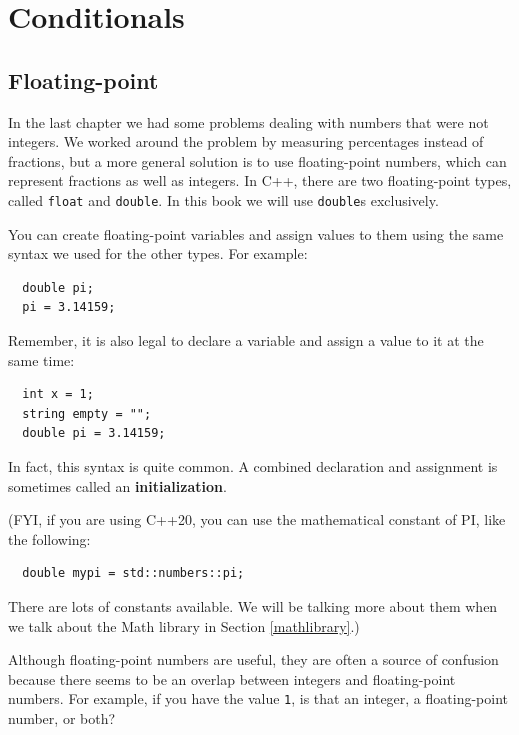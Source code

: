 

\chapter{Conditionals}
\label{conditional}

\section{Floating-point}
\label{floating-point}

In the last chapter we had some problems dealing with numbers
that were not integers.  We worked around the problem by measuring
percentages instead of fractions, but a more general solution is
to use floating-point numbers, which can represent fractions
as well as integers.  In C++, there are two floating-point types,
called {\tt float} and {\tt double}.  In this book we will use
{\tt double}s exclusively.

You can create floating-point variables and assign values to them
using the same syntax we used for the other types.  For example:

\begin{lstlisting}
  double pi;
  pi = 3.14159;
\end{lstlisting}
%
Remember, it is also legal to declare a variable and assign a value to it at the
same time:

\begin{lstlisting}
  int x = 1;
  string empty = "";
  double pi = 3.14159;
\end{lstlisting}
%
In fact, this syntax is quite common.  A combined declaration
and assignment is sometimes called an {\bf initialization}.

(FYI, if you are using C++20, you can use the mathematical
constant of PI, like the following:
\begin{lstlisting}
  double mypi = std::numbers::pi;
\end{lstlisting}
There are lots of constants available. We will be talking 
more about them when we talk about the Math library in Section \ref{mathlibrary}.)


Although floating-point numbers are useful, they are
often a source of confusion because there seems to be an
overlap between integers and floating-point numbers.  For
example, if you have the value {\tt 1}, is that an integer,
a floating-point number, or both?

